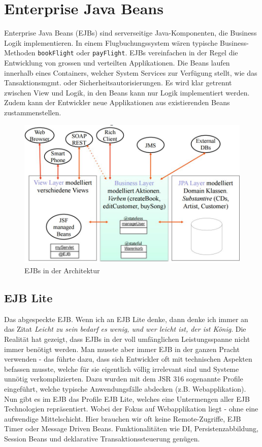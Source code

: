 \chapter{Enterprise Java Beans}
Enterprise Java Beans (EJBs) sind serverseitige Java-Komponenten, die Business Logik implementieren. In einem Flugbuchungssystem wären typische Business-Methoden \verb|bookFlight| oder \verb|payFlight|. EJBs vereinfachen in der Regel die Entwicklung von grossen und verteilten Applikationen. Die Beans laufen innerhalb eines Containers, welcher System Services zur Verfügung stellt, wie das Tansaktionsmgmt. oder Sicherheitsautorisierungen. Es wird klar getrennt zwischen View und Logik, in den Beans kann nur Logik implementiert werden. Zudem kann der Entwickler neue Applikationen aus existierenden Beans zustammenstellen.

\begin{figure}[h!]
	\centering
	\includegraphics[width=0.7\linewidth]{fig/ejb-layering}
	\caption{EJBs in der Architektur}
	\label{fig:ejb-layering}
\end{figure}

\section{EJB Lite}
Das abgespeckte EJB. Wenn ich an EJB Lite denke, dann denke ich immer an das Zitat \emph{Leicht zu sein bedarf es wenig, und wer leicht ist, der ist König}. Die Realität hat gezeigt, dass EJBs in der voll umfänglichen Leistungsspanne nicht immer benötigt werden. Man musste aber immer EJB in der ganzen Pracht verwenden - das führte dazu, dass sich Entwickler oft mit technischen Aspekten befassen musste, welche für sie eigentlich völlig irrelevant sind und Systeme unnötig verkomplizierten. Dazu wurden mit dem JSR 316 sogenannte Profile eingeführt, welche typische Anwendungsfälle abdecken (z.B. Webapplikation). Nun gibt es im EJB das Profile EJB Lite, welches eine Untermengen aller EJB Technologien repräsentiert. Wobei der Fokus auf Webapplikation liegt - ohne eine aufwendige Mittelschicht. Hier brauchen wir oft keine Remote-Zugriffe, EJB Timer oder Message Driven Beans. Funktionalitäten wie DI, Persistenzabbildung, Session Beans und deklarative Transaktionssteuerung genügen.


